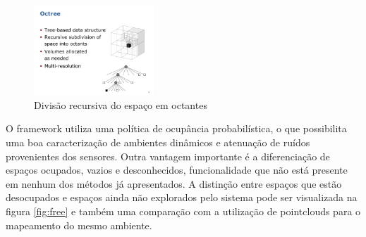 \begin{itemize}
    \begin{figure}[h!]
    \centering
    \includegraphics[width=0.4\textwidth]{figs/3d/octree}
    \caption{Divisão recursiva do espaço em octantes}
    \label{fig:octree}
\end{figure}
    O framework utiliza uma política de ocupância probabilística, o que possibilita uma boa caracterização de ambientes dinâmicos e atenuação de ruídos provenientes dos sensores. Outra vantagem importante é a diferenciação de espaços ocupados, vazios e desconhecidos, funcionalidade que não está presente em nenhum dos métodos já apresentados. A distinção entre espaços que estão desocupados e espaços ainda não explorados pelo sistema  pode ser visualizada na figura \ref{fig:free} e também uma comparação com a utilização de pointclouds para o mapeamento do mesmo ambiente.


\end{itemize}
